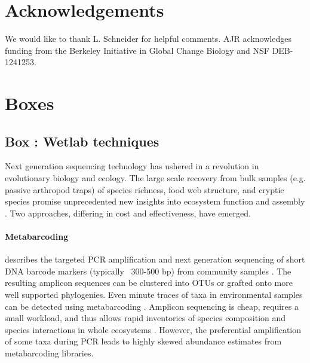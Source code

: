 \documentclass[12pt]{article}
\newcounter{Box}
\begin{document}
\section*{Acknowledgements}

We would like to thank L. Schneider for helpful comments. AJR
acknowledges funding from the Berkeley Initiative in Global Change
Biology and NSF DEB-1241253.

\pagebreak




\pagebreak

\section*{Boxes}


\label{box:wet}
\subsection*{Box \theBox: Wetlab techniques}
    
Next generation sequencing technology has ushered in a revolution in
evolutionary biology and ecology. The large scale recovery from bulk
samples (e.g. passive arthropod traps) of species richness, food web
structure, and cryptic species promise unprecedented new insights into
ecosystem function and assembly \citep{krehenwinkel2016,
  shokralla2015, gibson2014, taberlet2012}.  Two approaches, differing
in cost and effectiveness, have emerged.

\paragraph{Metabarcoding} describes the targeted PCR amplification and
next generation sequencing of short DNA barcode markers (typically
~300-500 bp) from community samples \citep{Yu2012, ji2013}. The
resulting amplicon sequences can be clustered into OTUs or grafted
onto more well supported phylogenies. Even minute traces of taxa in
environmental samples can be detected using metabarcoding
\citep{bohmann2014}.  Amplicon sequencing is cheap, requires a small
workload, and thus allows rapid inventories of species composition and
species interactions in whole ecosystems \citep{gibson2014, leray2015,
  pompanon2012}. However, the preferential amplification of some taxa
during PCR leads to highly skewed abundance estimates
\citep{Yu2012, elbrecht2015} from metabarcoding libraries.
\end{document}
